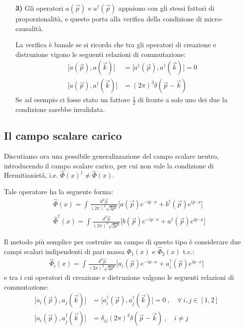 \documentclass[../main.tex]{subfiles}
\begin{document}
\begin{enumerate}
    \item[\textbf{3)}] Gli operatori $a(\Vec{p})$ e $a^\dagger(\Vec{p})$ appaiono con gli stessi fattori di proporzionalità, e questo porta alla verifica della condizione di micro-causalità. 
    
    La verifica è banale se si ricorda che tra gli operatori di creazione e distruzione vigono le seguenti relazioni di commutazione:
    \begin{equation}
        \boxed{
        \begin{aligned}
            \big[ a(\Vec{p}), a(\Vec{k}) \big] &= \big[ a^\dagger(\Vec{p}), a^\dagger(\Vec{k}) \big] = 0\\
            \big[a(\Vec{p}), a^\dagger(\Vec{k}) \big] &= (2\pi)^3\delta(\Vec{p}-\Vec{k})
        \end{aligned}
        }
        \label{eq:creat_annihl_comm_rel}
    \end{equation}
    Se ad esempio ci fosse stato un fattore \(\frac{1}{2}\) di fronte a solo uno dei due la condizione sarebbe invalidata.
\end{enumerate}

\subsection{Il campo scalare carico}
Discutiamo ora una possibile generalizzazione del campo scalare neutro, introducendo il campo scalare carico, per cui non vale la condizione di Hermitianietà, i.e. $\hat{\Phi}(x)^\dagger \neq \hat{\Phi}(x)$.

Tale operatore ha la seguente forma:
\begin{equation}
    \boxed{\begin{aligned}
        &\hat{\Phi}(x) = \int_{}\frac{d^3\Vec{p}}{(2\pi)^3\sqrt{2p^0}}\big[ a(\Vec{p})e^{-ip\cdot x} + b^\dagger(\Vec{p})e^{ip\cdot x} \big]\\
        &\hat{\Phi}^\dagger(x) = \int_{}\frac{d^3\Vec{p}}{(2\pi)^3\sqrt{2p^0}}\big[ b(\Vec{p})e^{-ip\cdot x} + a^\dagger(\Vec{p})e^{ip\cdot x} \big]
    \end{aligned}}
    \label{eq:charged_scalar_field}
\end{equation}

Il metodo più semplice per costruire un campo di questo tipo è considerare due campi scalari indipendenti di pari massa $\hat{\Phi}_1(x)$ e $\hat{\Phi}_2(x)$ t.c.:
\begin{align*}
    \hat{\Phi}_i(x) = \int_{}\frac{d^3\Vec{p}}{(2\pi)^3\sqrt{2p^0}}\big[ a_i(\Vec{p})e^{-ip\cdot x} + a_i^\dagger(\Vec{p})e^{ip\cdot x} \big]
\end{align*}
e tra i cui operatori di creazione e distruzione valgono le seguenti relazioni di commutazione:
\begin{align*}
    \big[ a_i(\Vec{p}), a_j(\Vec{k}) \big] &= \big[ a_i^\dagger(\Vec{p}), a_j^\dagger(\Vec{k}) \big] = 0~, \quad \forall~i,j\in[1,2]\\
    \big[a_i(\Vec{p}), a_j^\dagger(\Vec{k}) \big] &= \delta_{ij}(2\pi)^3\delta(\Vec{p}-\Vec{k}) ~,\quad i\neq j
\end{align*}
\end{document}
